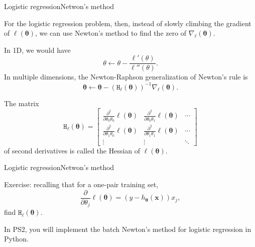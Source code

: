 \documentclass{beamer}
\renewcommand{\vec}[1]{\boldsymbol{#1}}
\newcommand{\mat}[1]{\mathtt{#1}}
\begin{document}
\begin{frame}{Logistic regression}{Netwon's method}

  For the logistic regression problem, then, instead of slowly
  climbing the gradient of $\ell(\vec{\theta})$, we can use Newton's
  method to \alert{find the zero of $\nabla_\ell(\vec{\theta})$}.

  \medskip

  In 1D, we would have
  \[ \theta \leftarrow \theta - \frac{\ell'(\theta)}{\ell''(\theta)} .\]
  In multiple dimensions, the Newton-Raphson generalization of Newton's rule is
  \[ \vec{\theta} \leftarrow \vec{\theta} - (\mat{H}_\ell(\vec{\theta}))^{-1} \nabla_\ell(\vec{\theta}) .\]

  The matrix
  \[ \mat{H}_\ell(\vec{\theta}) = \begin{bmatrix}
    \frac{\partial^2}{\partial \theta_0 \theta_0}\ell(\vec{\theta}) &
    \frac{\partial^2}{\partial \theta_0 \theta_1}\ell(\vec{\theta}) &
    \cdots \\
    \frac{\partial^2}{\partial \theta_1 \theta_0}\ell(\vec{\theta}) &
    \frac{\partial^2}{\partial \theta_1 \theta_1}\ell(\vec{\theta}) &
    \cdots \\
    \vdots & \vdots & \ddots   
  \end{bmatrix}
  \]
  of second derivatives
  is called the \alert{Hessian} of $\ell(\vec{\theta})$.

\end{frame}


\begin{frame}{Logistic regression}{Netwon's method}

  \alert{Exercise}: recalling that for a one-pair training set,
  \[ \frac{\partial}{\partial \theta_j} \ell(\vec{\theta}) =
    (y-h_{\vec{\theta}}(\vec{x})) x_j ,\]
  find $\mat{H}_\ell(\vec{\theta})$.
  

  \medskip
  
  In PS2, you will implement the batch Newton's method for logistic
  regression in Python.
  
\end{frame}
\end{document}
